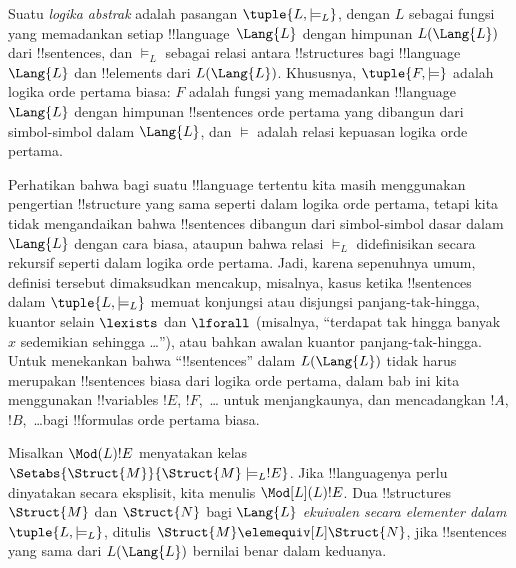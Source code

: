 \documentclass[../../../include/open-logic-section]{subfiles}
\begin{document}

\begin{defn}
Suatu \emph{logika abstrak} adalah pasangan $\tuple{L, \models_L}$, dengan
$L$ sebagai fungsi yang memadankan setiap !!{language}~$\Lang{L}$ dengan
himpunan $L(\Lang{L})$ dari !!{sentence}s, dan $\models_L$ sebagai relasi
antara !!{structure}s bagi !!{language}~$\Lang{L}$ dan !!{element}s dari
$L(\Lang{L})$. Khususnya, $\tuple{F, \models}$ adalah logika orde pertama
biasa: $F$ adalah fungsi yang memadankan !!{language}~$\Lang{L}$ dengan
himpunan !!{sentence}s orde pertama yang dibangun dari simbol-simbol dalam
$\Lang{L}$, dan $\models$ adalah relasi kepuasan logika orde pertama.
\end{defn}

Perhatikan bahwa bagi suatu !!{language} tertentu kita masih menggunakan
pengertian !!{structure} yang sama seperti dalam logika orde pertama, tetapi
kita tidak mengandaikan bahwa !!{sentence}s dibangun dari simbol-simbol dasar
dalam $\Lang{L}$ dengan cara biasa, ataupun bahwa relasi $\models_L$
didefinisikan secara rekursif seperti dalam logika orde pertama. Jadi, karena
sepenuhnya umum, definisi tersebut dimaksudkan mencakup, misalnya, kasus ketika
!!{sentence}s dalam $\tuple{L,\models_L}$ memuat konjungsi atau disjungsi
panjang-tak-hingga, kuantor selain $\lexists$ dan $\lforall$ (misalnya,
``terdapat tak hingga banyak~$x$ sedemikian sehingga \dots''), atau bahkan
awalan kuantor panjang-tak-hingga. Untuk menekankan bahwa ``!!{sentence}s''
dalam $L(\Lang{L})$ tidak harus merupakan !!{sentence}s biasa dari logika
orde pertama, dalam bab ini kita menggunakan !!{variable}s $!E$, $!F$,~\dots
untuk menjangkaunya, dan mencadangkan $!A$, $!B$,~\dots bagi !!{formula}s
orde pertama biasa.

\begin{defn}
Misalkan $\Mod(L){!E}$ menyatakan kelas
$\Setabs{\Struct{M}}{\Struct{M} \models_L !E}$. Jika !!{language}nya perlu
dinyatakan secara eksplisit, kita menulis $\Mod[L](L){!E}$. Dua !!{structure}s
$\Struct{M}$ dan $\Struct{N}$ bagi $\Lang{L}$ \emph{ekuivalen secara
elementer dalam} $\tuple{L, \models_L}$, ditulis $\Struct{M}
\elemequiv[L] \Struct{N}$, jika !!{sentence}s yang sama dari $L(\Lang{L})$
bernilai benar dalam keduanya.
\end{defn}
\end{document}
